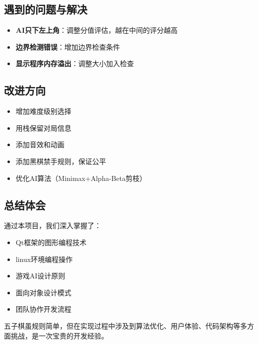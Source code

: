 \documentclass[UTF8]{ctexart}
\begin{document}
\subsection{遇到的问题与解决}
\begin{itemize}
    \item \textbf{AI只下左上角}：调整分值评估，越在中间的评分越高
    \item \textbf{边界检测错误}：增加边界检查条件
    \item \textbf{显示程序内存溢出}：调整大小加入检查
\end{itemize}

\subsection{改进方向}
\begin{itemize}
    \item 增加难度级别选择
    \item 用栈保留对局信息
    \item 添加音效和动画
    \item 添加黑棋禁手规则，保证公平
    \item 优化AI算法（Minimax+Alpha-Beta剪枝）
\end{itemize}

\subsection{总结体会}
通过本项目，我们深入掌握了：
\begin{itemize}
    \item Qt框架的图形编程技术
    \item linux环境编程操作
    \item 游戏AI设计原则
    \item 面向对象设计模式
    \item 团队协作开发流程
\end{itemize}
	五子棋虽规则简单，但在实现过程中涉及到算法优化、用户体验、代码架构等多方面挑战，是一次宝贵的开发经验。
\end{document}
